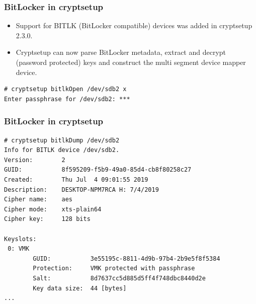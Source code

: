 \documentclass{beamer}
\begin{document}
\begin{frame}[fragile]
	\frametitle{BitLocker in cryptsetup}

	\begin{block}{}
		\begin{itemize}
			\item Support for BITLK (BitLocker compatible) devices was added in cryptsetup 2.3.0\footnotemark.
			\item Cryptsetup can now parse BitLocker metadata, extract and decrypt (password protected) keys and construct the multi segment device mapper device.
		\end{itemize}
	\end{block}

\vspace{0.25cm}
	
\begin{lstlisting}[frame=none, basicstyle=\ttfamily\small, columns=fullflexible, keepspaces=true]
# cryptsetup bitlkOpen /dev/sdb2 x
Enter passphrase for /dev/sdb2: ***
\end{lstlisting}

\end{frame}

\begin{frame}[fragile]
	\frametitle{BitLocker in cryptsetup}

\begin{lstlisting}[frame=none, basicstyle=\ttfamily\small, columns=fullflexible, keepspaces=true]
# cryptsetup bitlkDump /dev/sdb2
Info for BITLK device /dev/sdb2.
Version:        2
GUID:           8f595209-f5b9-49a0-85d4-cb8f80258c27
Created:        Thu Jul  4 09:01:55 2019
Description:    DESKTOP-NPM7RCA H: 7/4/2019
Cipher name:    aes
Cipher mode:    xts-plain64
Cipher key:     128 bits

Keyslots:
 0: VMK
        GUID:           3e55195c-8811-4d9b-97b4-2b9e5f8f5384
        Protection:     VMK protected with passphrase
        Salt:           8d7637cc5d885d5ff4f748dbc8440d2e
        Key data size:  44 [bytes]
...
\end{lstlisting}

\end{frame}
\end{document}
